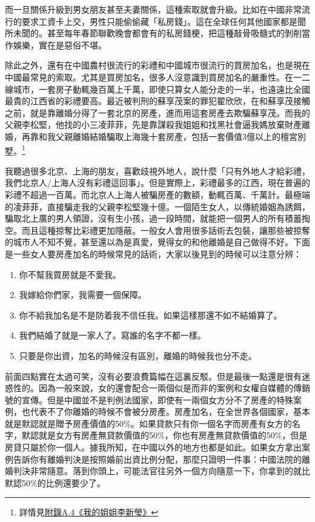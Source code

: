 而一旦關係升級到男女朋友甚至夫妻關係，這種索取就會升級。比如在中國非常流行的要求工資卡上交，男性只能偷偷藏「私房錢」。這在全球任何其他國家都是聞所未聞的。甚至每年春節聯歡晚會都會有的私房錢梗，把這種敲骨吸髓式的剝削當作娛樂，實在是惡俗不堪。

除此之外，還有在中國農村很流行的彩禮和中國城市很流行的買房加名，也是現在中國最常見的索取。尤其是買房加名，很多人沒意識到買房加名的嚴重性。在一二線城市，一套房子動輒幾百萬上千萬，即使只算女人能分走的一半，也遠遠比全國最貴的江西省的彩禮要高。最近被判刑的蘇享茂案的罪犯翟欣欣，在和蘇享茂接觸之前，就是靠離婚分得了一套北京的房產，進而用這套房產去欺騙蘇享茂。而我的父親李松堅，他找的小三凌菲菲，先是靠謀殺我姐姐和找黑社會逼我媽放棄財產離婚，再靠和我父親離婚結婚騙取上海幾十套房產，包括一套價值3億以上的檀宮別墅。\footnote{詳情見\hyperref[sister]{附錄A.4《我的姐姐李新瑩》}}

我聽過很多北京、上海的朋友，喜歡歧視外地人，說什麼「只有外地人才給彩禮，我們北京人/上海人沒有彩禮這回事」。但是實際上，彩禮最多的江西，現在普遍的彩禮不超過一百萬。而北京人上海人被騙房產的數額，動輒百萬、千萬計。最極端的凌菲菲，直接騙走我的父親李松堅幾十億。一個陌生女人，以傳統婚姻為誘餌，騙取北上廣的男人領證，沒有生小孩，過一段時間，就能把一個男人的所有積蓄掏空。而且這種掠奪比彩禮更加隱蔽。一般女人會用很多話術去包裝，讓那些被掠奪的城市人不知不覺，甚至還以為是真愛，覺得女的和他離婚是自己做得不好。下面是一些女人要房產加名的時候常見的話術，大家以後見到的時候可以注意分辨：
\begin{enumerate}
\item 你不幫我買房就是不愛我。
\item 我嫁給你們家，我需要一個保障。
\item 你不給我加名是不是防着我不信任我。如果這樣那還不如不結婚算了。
\item 我們結婚了就是一家人了。寫誰的名字不都一樣。
\item 只要是你出資，加名的時候沒有區別，離婚的時候我也分不走。
\end{enumerate}

前面四點實在太過可笑，沒有必要浪費篇幅在這裏反駁。但是最後一點還是很有迷惑性的。因為一般來說，女的還會配合一兩個似是而非的案例和女權自媒體的傳銷號的宣傳。但是中國並不是判例法國家，即使有一兩個女方分不了房產的特殊案例，也代表不了你離婚的時候不會被分房產。房產加名，在全世界各個國家，基本就是默認就是贈予房產價值的50\%。如果貸款只有你一個名字而房產有女方的名字，默認就是女方有房產無貸款價值的50\%，你也有房產無貸款價值的50\%，但是房貸只屬於你一個人。據我所知，在中國以外的地方也都是如此。如果女方拿出案例告訴你有離婚判決是按照婚前出資比例分配，那麼只證明一件事：中國法院的離婚判決非常隨意。落到你頭上，可能法官往另外一個方向隨意一下，你拿到的就比默認50\%的比例還要少了。

